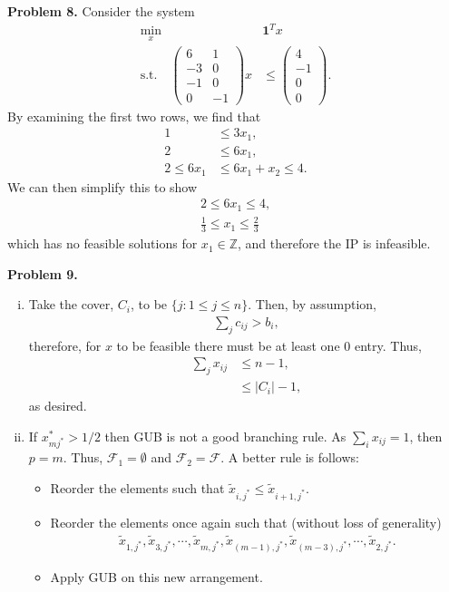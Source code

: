 \documentclass[11pt,a4paper]{article}
\begin{document}
\textbf{Problem 8.}
Consider the system
\begin{align*}
	\min_x \, &\mathbf{1}^T x \\
	\text{s.t.} \quad
	\begin{pmatrix}
		6 & 1 \\
		-3 & 0 \\
		-1 & 0 \\
		0 & -1
	\end{pmatrix}
	x &\leq
	\begin{pmatrix}
		4 \\
		-1 \\
		0 \\
		0
	\end{pmatrix}.
\end{align*}
By examining the first two rows, we find that
\begin{align*}
	1 &\leq 3 x_1, \\
	2 &\leq 6 x_1, \\
	2 \leq 6 x_1 &\leq 6 x_1 + x_2 \leq 4.
\end{align*}
We can then simplify this to show
\begin{align*}
	2 \leq 6 x_1 \leq 4, \\
	\frac{1}{3} \leq x_1 \leq \frac{2}{3}
\end{align*}
which has no feasible solutions for $x_1 \in \mathbb{Z}$, and therefore the IP is infeasible.

\textbf{Problem 9.}

\begin{enumerate}[i)]
	\item Take the cover, $C_i$, to be $\{ j : 1 \leq j \leq n \}$. Then, by assumption,
	\begin{align*}
		\sum_j c_{ij} > b_i,
	\end{align*}
	therefore, for $x$ to be feasible there must be at least one $0$ entry. Thus,
	\begin{align*}
		\sum_j x_{ij} &\leq n - 1, \\
		&\leq |C_i| - 1,
	\end{align*}
	as desired.
	\item If $x_{mj^*}^* > 1/2$ then GUB is not a good branching rule. As $\sum_i x_{ij} = 1$, then $p = m$. Thus, $\mathscr{F}_1 = \emptyset$ and $\mathscr{F}_2 = \mathscr{F}$. A better rule is follows:
	\begin{itemize}
		\item Reorder the elements such that $\tilde{x}_{i,j^*} \leq \tilde{x}_{i+1,j^*}$.
		\item Reorder the elements once again such that (without loss of generality)
		\begin{align*}
			\tilde{x}_{1,j^*}, \tilde{x}_{3,j^*}, \cdots, \tilde{x}_{m,j^*}, \tilde{x}_{(m - 1),j^*}, \tilde{x}_{(m - 3),j^*}, \cdots, \tilde{x}_{2,j^*}.
		\end{align*}
		\item Apply GUB on this new arrangement.
	\end{itemize}
\end{enumerate}

%
\end{document}
